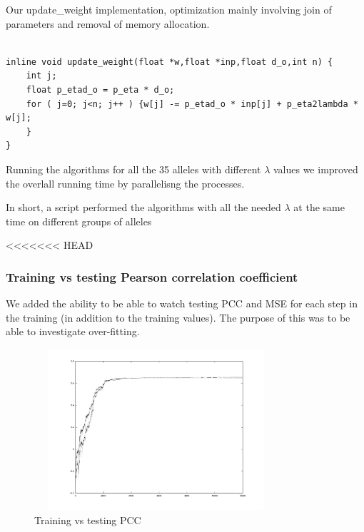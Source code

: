 \documentclass[presentation]{beamer}   %
\begin{document}
\begin{frame}
Our update\_weight implementation, optimization mainly involving join of parameters and removal of memory allocation.
 \begin{lstlisting}[basicstyle=\scriptsize,format=C]

inline void update_weight(float *w,float *inp,float d_o,int n) {
	int j;
	float p_etad_o = p_eta * d_o;
	for ( j=0; j<n; j++ ) {w[j] -= p_etad_o * inp[j] + p_eta2lambda * w[j];
	}
}
  \end{lstlisting}
  \pause
  \begin{block}\centering
	Running the algorithms for all the 35 alleles with different $\lambda$ values we improved the overlall running time by parallelisng the processes.
	\par In short, a script performed the algorithms with all the needed $\lambda$ at the same time on different groups of alleles
  \end{block}

<<<<<<< HEAD
\begin{frame}
\frametitle{Training vs testing Pearson correlation coefficient}
We added the ability to be able to watch testing PCC and MSE for each step in the training (in addition to the training values). The purpose of this was to be able to investigate over-fitting.
		\begin{figure}
		\centering
			\includegraphics[width=90mm,height=60mm]{fig/pcc2.pdf}
			\caption{Training vs testing PCC}
		\end{figure}
\end{frame}


\end{frame}
\end{document}
